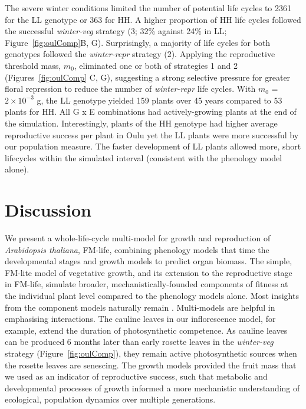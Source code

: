 The severe winter conditions limited the number of potential life cycles to 2361
for the LL genotype or 363 for HH. A higher proportion of HH life cycles
followed the successful \emph{winter-veg} strategy (3; 32\% against 24\% in LL;
Figure~\ref{fig:oulComp}B, G). Surprisingly, a majority of life cycles for both genotypes
followed the \emph{winter-repr} strategy (2).  Applying the reproductive
threshold mass, \(m_{0}\), eliminated one or both of strategies 1 and 2 (Figures~\ref{fig:oulComp}
C, G), suggesting a strong selective pressure for greater floral repression to
reduce the number of \emph{winter-repr} life cycles. With \(m_{0}\) =
\(2 \times 10^{- 3}\) g, the LL genotype yielded 159 plants over 45 years
compared to 53 plants for HH. All G x E combinations had actively-growing plants
at the end of the simulation. Interestingly, plants of the HH genotype had
higher average reproductive success per plant in Oulu yet the LL plants were
more successful by our population measure. The faster development of LL plants
allowed more, short lifecycles within the simulated interval (consistent with
the phenology model alone).

\section{Discussion}
\label{discussion}

We present a whole-life-cycle multi-model for growth and reproduction of
\emph{Arabidopsis thaliana}, FM-life, combining phenology models that time the
developmental stages and growth models to predict organ biomass. The simple,
FM-lite model of vegetative growth, and its extension to the reproductive stage
in FM-life, simulate broader, mechanistically-founded components of fitness at
the individual plant level compared to the phenology models alone. Most insights
from the component models naturally remain
\citep{rasse_leaf_2006,christophe_model-based_2008,
  wilczek_effects_2009,burghardt_modeling_2015}. Multi-models are helpful in
emphasising interactions. The cauline leaves in our inflorescence model, for
example, extend the duration of photosynthetic competence. As cauline leaves can
be produced 6 months later than early rosette leaves in the \emph{winter-veg}
strategy (Figure~\ref{fig:oulComp}), they remain active photosynthetic sources
\citep{earley_inflorescences_2009, leonardos_photosynthetic_2014} when the
rosette leaves are senescing. The growth models provided the fruit mass that we
used as an indicator of reproductive success, such that metabolic and
developmental processes of growth informed a more mechanistic understanding of
ecological, population dynamics over multiple generations.

